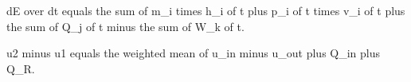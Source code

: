 dE over dt equals the sum of m_i times h_i of t plus p_i of t times v_i of t plus the sum of Q_j of t minus the sum of W_k of t.  

u2 minus u1 equals the weighted mean of u_in minus u_out plus Q_in plus Q_R.